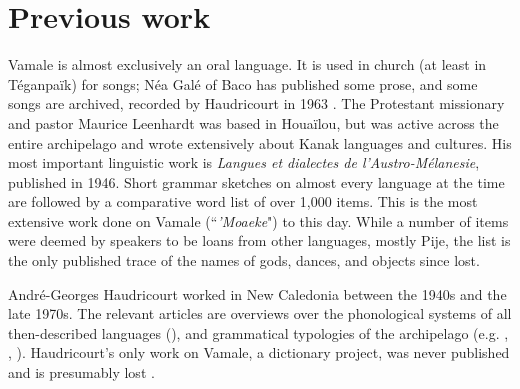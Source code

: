  	
 	
 	
 	
 
 \section{Previous work}
 \label{sec:prev_work}
 \largerpage
 Vamale is almost exclusively an oral language. It is used in church (at least in Téganpaïk) for songs; Néa Galé of Baco has published some prose, and some songs are archived, recorded by Haudricourt in 1963 \parencite{nea_poesie_1963}. 
 The Protestant missionary and pastor Maurice Leenhardt was based in Houa\"ilou, but was active across the entire archipelago and wrote extensively about Kanak languages and cultures. His most important linguistic work is \textit{Langues et dialectes de l'Austro-Mélanesie}, published in 1946. Short grammar sketches on almost every language at the time are followed by a comparative word list of over 1,000 items. This is the most extensive work done on Vamale (``\textit{'Moaeke}") to this day. While a number of items were deemed by speakers to be loans from other languages, mostly Pije, the list is the only published trace of the names of gods, dances, and objects since lost.
 
André-Georges Haudricourt worked in New Caledonia between the 1940s and the late 1970s. The relevant articles are overviews over the phonological systems of all then-described languages (\citeyear{haudricourt_richesse_1961}), and grammatical typologies of the archipelago (e.g. \citeyear{haudricourt_langues_1948}, \citeyear{haudricourt_new_1972}, \citeyear{haudricourt_langues_1948}). Haudricourt's only work on Vamale, a dictionary project, was never published and is presumably lost \parencite[18]{rivierre_bwatoo_2006}. 

